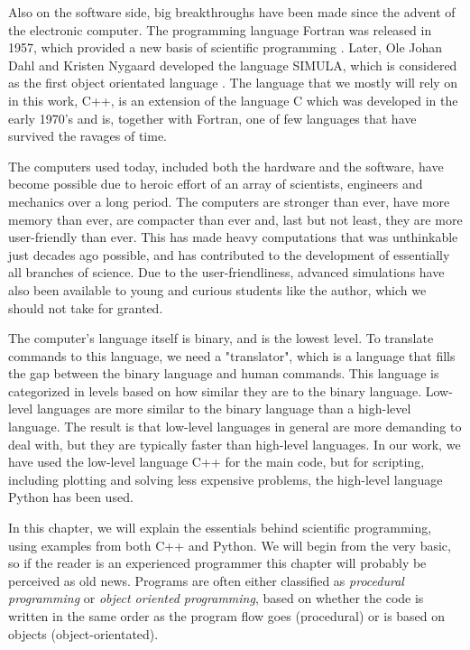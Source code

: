 Also on the software side, big breakthroughs have been made since the advent of the electronic computer. The programming language Fortran was released in 1957, which provided a new basis of scientific programming \cite{allen_history_1981}. Later, Ole Johan Dahl and Kristen Nygaard developed the language SIMULA, which is considered as the first object orientated language \cite{holmevik_compiling_1994}. The language that we mostly will rely on in this work, C++, is an extension of the language C which was developed in the early 1970's and is, together with Fortran, one of few languages that have survived the ravages of time. 

The computers used today, included both the hardware and the software, have become possible due to heroic effort of an array of scientists, engineers and mechanics over a long period. The computers are stronger than ever, have more memory than ever, are compacter than ever and, last but not least, they are more user-friendly than ever. This has made heavy computations that was unthinkable just decades ago possible, and has contributed to the development of essentially all branches of science. Due to the user-friendliness, advanced simulations have also been available to young and curious students like the author, which we should not take for granted. 

The computer's language itself is binary, and is the lowest level. To translate commands to this language, we need a "translator", which is a language that fills the gap between the binary language and human commands. This language is categorized in levels based on how similar they are to the binary language. Low-level languages are more similar to the binary language than a high-level language. The result is that low-level languages in general are more demanding to deal with, but they are typically faster than high-level languages. In our work, we have used the low-level language C++ for the main code, but for scripting, including plotting and solving less expensive problems, the high-level language Python has been used. 

In this chapter, we will explain the essentials behind scientific programming, using examples from both C++ and Python. We will begin from the very basic, so if the reader is an experienced programmer this chapter will probably be perceived as old news. Programs are often either classified as \textit{procedural programming} or \textit{object oriented programming}, based on whether the code is written in the same order as the program flow goes (procedural) or is based on objects (object-orientated).

